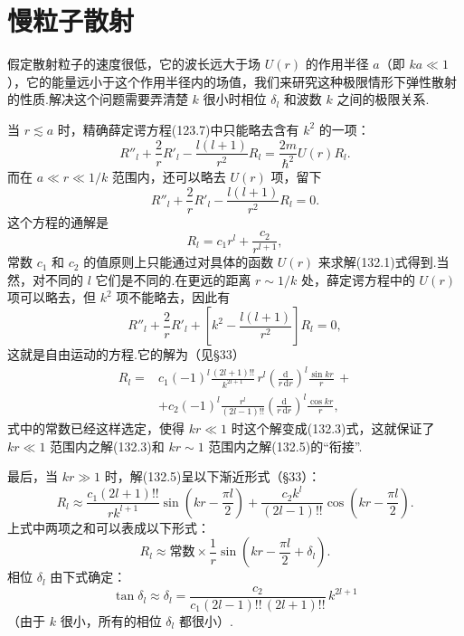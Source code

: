 \section{慢粒子散射}

假定散射粒子的速度很低，它的波长远大于场 $U(r)$ 的作用半径 $a$（即 $ka\ll1$），它的能量远小于这个作用半径内的场值，我们来研究这种极限情形下弹性散射的性质.解决这个问题需要弄清楚 $k$ 很小时相位 $\delta_l$ 和波数 $k$ 之间的极限关系.

当 $r\lesssim a$ 时，精确薛定谔方程(123.7)中只能略去含有 $k^2$ 的一项：
\begin{equation}
  R''_l+\frac{2}{r}R'_l-\frac{l(l+1)}{r^2}R_l
  =\frac{2m}{\hbar^2}U(r)R_l.
\end{equation}
而在 $a\ll r\ll1/k$ 范围内，还可以略去 $U(r)$ 项，留下
\begin{equation}
  R''_l+\frac{2}{r}R'_l-\frac{l(l+1)}{r^2}R_l=0.
\end{equation}
这个方程的通解是
\begin{equation}
  R_l=c_1r^l+\frac{c_2}{r^{l+1}},
\end{equation}
常数 $c_1$ 和 $c_2$ 的值原则上只能通过对具体的函数 $U(r)$ 来求解(132.1)式得到.当然，对不同的 $l$ 它们是不同的.在更远的距离 $r\sim1/k$ 处，薛定谔方程中的 $U(r)$ 项可以略去，但 $k^2$ 项不能略去，因此有
\begin{equation}
  R''_l+\frac{2}{r}R'_l+
  \left[k^2-\frac{l(l+1)}{r^2}\right]R_l=0,
\end{equation}
这就是自由运动的方程.它的解为（见§33）
\begin{equation}
\begin{aligned}
  R_l={}&c_1(-1)^l\frac{(2l+1)!!}{k^{2l+1}}\,r^l
  \left(\frac{\mathrm{d}}{r\,\mathrm{d}r}\right)^{l}
  \frac{\sin kr}{r}\,+\\
  &+c_2(-1)^l\frac{r^l}{(2l-1)!!}
  \left(\frac{\mathrm{d}}{r\,\mathrm{d}r}\right)^{l}
  \frac{\cos kr}{r},
\end{aligned}
\end{equation}
式中的常数已经这样选定，使得 $kr\ll1$ 时这个解变成(132.3)式，这就保证了$kr\ll1$ 范围内之解(132.3)和 $kr\sim1$ 范围内之解(132.5)的“衔接”.

最后，当 $kr\gg1$ 时，解(132.5)呈以下渐近形式（§33）：
\begin{equation*}
  R_l\approx\frac{c_1(2l+1)!!}{rk^{l+1}}
  \sin\left(kr-\frac{\pi l}{2}\right)
  +\frac{c_2k^l}{(2l-1)!!}
  \cos\left(kr-\frac{\pi l}{2}\right).
\end{equation*}
上式中两项之和可以表成以下形式：
\begin{equation}
  R_l\approx\text{常数}\times\frac{1}{r}
  \sin\left(kr-\frac{\pi l}{2}+\delta_l\right).
\end{equation}
相位 $\delta_l$ 由下式确定：
\begin{equation}
  \tan\delta_l\approx\delta_l
  =\frac{c_2}{c_1(2l-1)!!\,(2l+1)!!}\,k^{2l+1}
\end{equation}
（由于 $k$ 很小，所有的相位 $\delta_l$ 都很小）.


